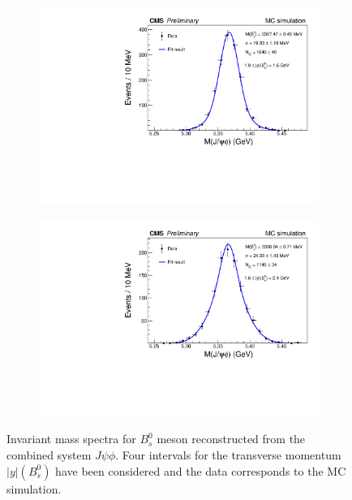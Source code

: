 \begin{figure}
\begin{subfigure}[b]{0.475\textwidth}
		\includegraphics[width=\textwidth]{MainContent/Figs/mass/mass_BsFitMC_best1_ybins_1.0_1.6.PDF}
		\caption{}
	\end{subfigure}
	\hfill
	\begin{subfigure}[b]{0.475\textwidth}
		\centering
		\includegraphics[width=\textwidth]{MainContent/Figs/mass/mass_BsFitMC_best1_ybins_1.6_2.4.PDF}
		\caption{}%
	\end{subfigure}
	\caption{Invariant mass spectra for $B^0_s$ meson reconstructed from the combined system $J\psi\phi$. Four intervals for the transverse momentum $|y|(B^0_s)$ have been considered and the data corresponds to the MC simulation.}
	\label{fig:massMC_ybins}
\end{figure}


